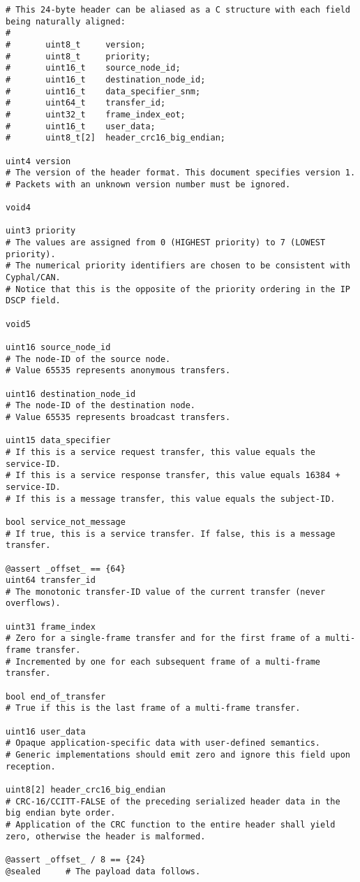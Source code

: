 \begin{samepage}
\begin{verbatim}
# This 24-byte header can be aliased as a C structure with each field being naturally aligned:
#
#       uint8_t     version;
#       uint8_t     priority;
#       uint16_t    source_node_id;
#       uint16_t    destination_node_id;
#       uint16_t    data_specifier_snm;
#       uint64_t    transfer_id;
#       uint32_t    frame_index_eot;
#       uint16_t    user_data;
#       uint8_t[2]  header_crc16_big_endian;

uint4 version
# The version of the header format. This document specifies version 1.
# Packets with an unknown version number must be ignored.

void4

uint3 priority
# The values are assigned from 0 (HIGHEST priority) to 7 (LOWEST priority).
# The numerical priority identifiers are chosen to be consistent with Cyphal/CAN.
# Notice that this is the opposite of the priority ordering in the IP DSCP field.

void5

uint16 source_node_id
# The node-ID of the source node.
# Value 65535 represents anonymous transfers.

uint16 destination_node_id
# The node-ID of the destination node.
# Value 65535 represents broadcast transfers.

uint15 data_specifier
# If this is a service request transfer, this value equals the service-ID.
# If this is a service response transfer, this value equals 16384 + service-ID.
# If this is a message transfer, this value equals the subject-ID.

bool service_not_message
# If true, this is a service transfer. If false, this is a message transfer.

@assert _offset_ == {64}
uint64 transfer_id
# The monotonic transfer-ID value of the current transfer (never overflows).

uint31 frame_index
# Zero for a single-frame transfer and for the first frame of a multi-frame transfer.
# Incremented by one for each subsequent frame of a multi-frame transfer.

bool end_of_transfer
# True if this is the last frame of a multi-frame transfer.

uint16 user_data
# Opaque application-specific data with user-defined semantics.
# Generic implementations should emit zero and ignore this field upon reception.

uint8[2] header_crc16_big_endian
# CRC-16/CCITT-FALSE of the preceding serialized header data in the big endian byte order.
# Application of the CRC function to the entire header shall yield zero, otherwise the header is malformed.

@assert _offset_ / 8 == {24}
@sealed     # The payload data follows.
\end{verbatim}
\end{samepage}

